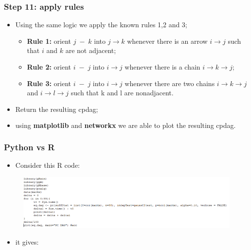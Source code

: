 \documentclass[xcolor ={table,usenames,dvipsnames}]{beamer}
\theoremstyle{definition}
\begin{document}
\begin{frame}
\frametitle{Step 11: apply rules}
\begin{itemize}
	\item Using the same logic we apply the known rules 1,2 and 3;
	\begin{itemize}
		\item \textbf{Rule 1:} orient $j\;-\;k$ into $j \rightarrow k$ whenever there is an arrow  $i \rightarrow j$ such that $i$ and $k$ are not adjacent;
		\item \textbf{Rule 2:} orient $i\;-\;j$ into $i \rightarrow j$ whenever there is a chain $i \rightarrow k \rightarrow j$;
		\item \textbf{Rule 3:} orient $i\;-\;j$ into $i \rightarrow j$ whenever there are two chains $i \rightarrow k \rightarrow j$ and $i \rightarrow l \rightarrow j$ such that k and l are nonadjacent.
	\end{itemize}
	\item Return the resulting cpdag;
	\item using \textbf{matplotlib} and \textbf{networkx} we are able to plot the resulting cpdag.
\end{itemize}
\end{frame}
\begin{frame}
\frametitle{Python vs R}
\begin{itemize}
	\item Consider this R code:
\end{itemize}
	\begin{figure}[h!]
		\centering
		\includegraphics[scale=0.5]{img/r.PNG}
	\end{figure}
\begin{itemize}
	\item it gives:
	\end{itemize}
\end{frame}
\end{document}
